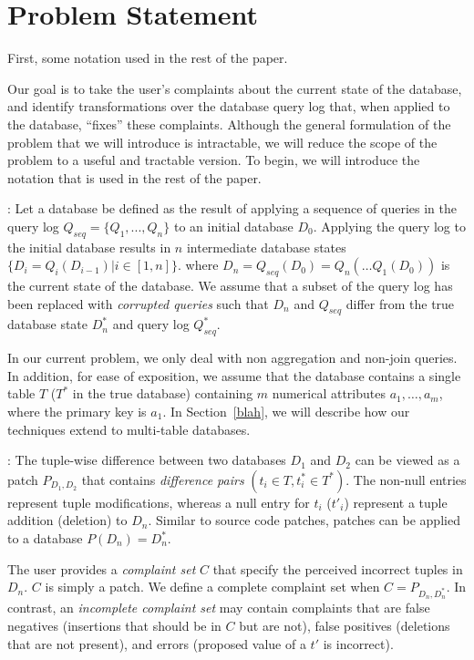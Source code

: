 \section{Problem Statement}

First, some notation used in the rest of the paper.

Our goal is to take the user's complaints about the current state
of the database, and identify transformations over the database
query log that, when applied to the database, ``fixes'' these
complaints.  Although the general formulation of the problem that
we will introduce is intractable, we will reduce the scope of the
problem to a useful and tractable version.  To begin, we will
introduce the notation that is used in the rest of the paper.

: Let a database
be defined as the result of applying a sequence of queries in the query log
$Q_{seq}=\{Q_1,..., Q_n\}$ to an initial database $D_0$.  
Applying the query log to the initial database 
results in $n$ intermediate database states $\{D_i = Q_i(D_{i-1}) | i \in [1, n]\}$.  
where $D_n = Q_{seq}(D_0) = Q_n(\ldots Q_1(D_0))$ is the current state of the database. 
We assume that a subset of the query log has been replaced with {\it corrupted queries} 
such that $D_n$ and $Q_{seq}$ differ from the true database state $D^*_n$ and query log $Q^*_{seq}$.

In our current problem, we only deal with non aggregation and non-join queries.
In addition, for ease of exposition, we assume that the database contains a single table $T$ 
($T^*$ in the true database) containing $m$ numerical attributes $a_1,\ldots,a_m$, 
where the primary key is $a_1$.  
In Section~\ref{blah}, we will describe how our techniques extend to multi-table databases.



:
The tuple-wise difference between two databases $D_1$ and $D_2$ can be viewed as a patch
$P_{D_1, D_2}$ that contains {\it difference pairs} $(t_i \in T, t^*_i \in T^*)$.
The non-null entries represent tuple modifications, whereas a null entry for $t_i$ ($t'_i$) represent a tuple addition (deletion) to $D_n$.
Similar to source code patches, patches can be applied to a database $P(D_n) = D^*_n$.

The user provides a {\it complaint set} $C$ that specify the perceived incorrect tuples in $D_n$.
$C$ is simply a patch.
We define a complete complaint set when $C = P_{D_n, D^*_n}$.
In contrast, an {\it incomplete complaint set}  may contain complaints that are false negatives (insertions that should be in $C$ but are not),
false positives (deletions that are not present), and errors (proposed value of a $t'$ is incorrect).

